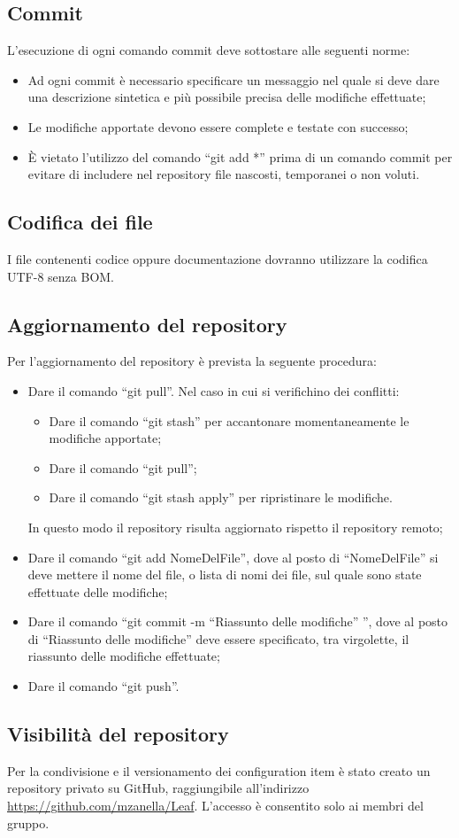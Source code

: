 \documentclass[../NormeProgetto.tex]{subfiles}
\begin{document}
	\subsection{Commit}
	L'esecuzione di ogni comando commit deve sottostare alle seguenti norme:
	\begin{itemize}
		\item Ad ogni commit è necessario specificare un messaggio nel quale si deve dare una descrizione sintetica e più possibile precisa delle modifiche effettuate;
		\item Le modifiche apportate devono essere complete e testate con successo;
		\item È vietato l'utilizzo del comando ``git add *'' prima di un comando commit per evitare di includere nel repository file nascosti, temporanei o non voluti.
	\end{itemize}
	\subsection{Codifica dei file}
	I file contenenti codice oppure documentazione dovranno utilizzare la codifica UTF-8 senza BOM.
	\subsection{Aggiornamento del repository}
	Per l'aggiornamento del repository è prevista la seguente procedura:
	\begin{itemize}
		\item Dare il comando ``git pull''. Nel caso in cui si verifichino dei conflitti:
			\begin{itemize}
			\item Dare il comando ``git stash'' per accantonare momentaneamente le modifiche apportate;
			\item Dare il comando ``git pull'';
			\item Dare il comando ``git stash apply'' per ripristinare le modifiche.
			\end{itemize}
		In questo modo il repository risulta aggiornato rispetto il repository remoto;
		\item Dare il comando ``git add NomeDelFile'', dove al posto di ``NomeDelFile'' si deve mettere il nome del file, o lista di nomi dei file, sul quale sono state effettuate delle modifiche;
		\item Dare il comando ``git commit -m ``Riassunto delle modifiche'' '', dove al posto di ``Riassunto delle modifiche'' deve essere specificato, tra virgolette, il riassunto delle modifiche effettuate;
		\item Dare il comando ``git push''.
	\end{itemize}
	\subsection{Visibilità del repository}
	Per la condivisione e il versionamento dei configuration item è stato creato un repository privato su GitHub, raggiungibile all'indirizzo \url{https://github.com/mzanella/Leaf}. L'accesso è consentito solo ai membri del gruppo.
\end{document}
